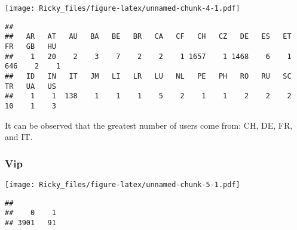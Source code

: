 \documentclass[
]{article}
\newenvironment{Shaded}{\begin{snugshade}}{\end{snugshade}}
\newcommand{\AttributeTok}[1]{\textcolor[rgb]{0.77,0.63,0.00}{#1}}
\newcommand{\DecValTok}[1]{\textcolor[rgb]{0.00,0.00,0.81}{#1}}
\newcommand{\FunctionTok}[1]{\textcolor[rgb]{0.00,0.00,0.00}{#1}}
\newcommand{\NormalTok}[1]{#1}
\newcommand{\SpecialCharTok}[1]{\textcolor[rgb]{0.00,0.00,0.00}{#1}}
\newcommand{\StringTok}[1]{\textcolor[rgb]{0.31,0.60,0.02}{#1}}
\begin{document}
\texttt{[image: Ricky\_files/figure-latex/unnamed-chunk-4-1.pdf]}

\begin{Shaded}
\end{Shaded}

\begin{verbatim}
## 
##   AR   AT   AU   BA   BE   BR   CA   CF   CH   CZ   DE   ES   ET   FR   GB   HU 
##    1   20    2    3    7    2    2    1 1657    1 1468    6    1  646    2    1 
##   ID   IN   IT   JM   LI   LR   LU   NL   PE   PH   RO   RU   SC   TR   UA   US 
##    1    1  138    1    1    1    5    2    1    1    2    2    2   10    1    3
\end{verbatim}

It can be observed that the greatest number of users come from: CH, DE,
FR, and IT.

\hypertarget{vip}{%
\subsubsection{Vip}\label{vip}}

\begin{Shaded}
\end{Shaded}

\texttt{[image: Ricky\_files/figure-latex/unnamed-chunk-5-1.pdf]}

\begin{Shaded}
\end{Shaded}

\begin{verbatim}
## 
##    0    1 
## 3901   91
\end{verbatim}
\end{document}
